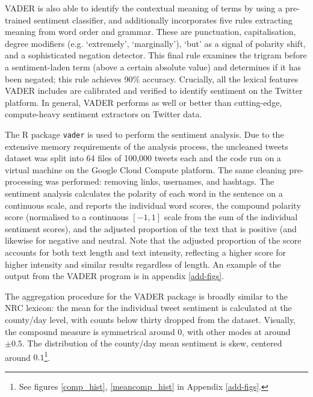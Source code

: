 \documentclass{article}
\begin{document}
VADER is also able to identify the contextual meaning of terms by using a pre-trained sentiment classifier, and additionally incorporates five rules extracting meaning from word order and grammar. These are punctuation, capitalisation, degree modifiers (e.g. `extremely', `marginally'), `but' as a signal of polarity shift, and a sophisticated negation detector. This final rule examines the trigram before a sentiment-laden term (above a certain absolute value) and determines if it has been negated; this rule achieves 90\% accuracy. Crucially, all the lexical features VADER includes are calibrated and verified to identify sentiment on the Twitter platform. In general, VADER performs as well or better than cutting-edge, compute-heavy sentiment extractors on Twitter data. 

The R package \texttt{vader} \parencite{roehrickVaderValenceAware2020} is used to perform the sentiment analysis. Due to the extensive memory requirements of the analysis process, the uncleaned tweets dataset was split into 64 files of 100,000 tweets each and the code run on a virtual machine on the Google Cloud Compute platform. The same cleaning pre-processing was performed: removing links, usernames, and hashtags. The sentiment analysis calculates the polarity of each word in the sentence on a continuous scale, and reports the  individual word scores, the compound polarity score (normalised to a continuous \([-1,1]\) scale from the sum of the individual sentiment scores), and the adjusted proportion of the text that is positive (and likewise for negative and neutral. Note that the adjusted proportion of the score accounts for both text length and text intensity, reflecting a higher score for higher intensity and similar results regardless of length. An example of the output from the VADER program is in appendix \ref{add-figs}.

The aggregation procedure for the VADER package is broadly similar to the NRC lexicon: the mean for the individual tweet sentiment is calculated at the county/day level, with counts below thirty dropped from the dataset. Visually, the compound measure is symmetrical around 0, with other modes at around \(\pm 0.5\). The distribution of the county/day mean sentiment is skew, centered around \(0.1\)\footnote{See figures \ref{comp_hist}, \ref{meancomp_hist} in Appendix \ref{add-figs}.}.
\end{document}
